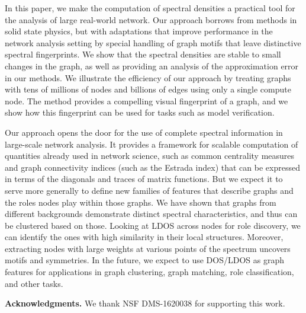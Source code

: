 In this paper, we make the computation of spectral densities a practical tool
for the analysis of large real-world network. Our approach borrows from methods
in solid state physics, but with adaptations that improve performance in the
network analysis setting by special handling of graph motifs that leave
distinctive spectral fingerprints. We show that the spectral densities are
stable to small changes in the graph, as well as providing an analysis of the
approximation error in our methods. We illustrate the efficiency of our
approach by treating graphs with tens of millions of nodes and billions of edges
using only a single compute node. The method provides a compelling visual
fingerprint of a graph, and we show how this fingerprint can be used for tasks
such as model verification.

Our approach opens the door for the use of complete spectral information in
large-scale network analysis. It provides a framework for scalable computation
of quantities already used in network science, such as common centrality
measures and graph connectivity indices (such as the Estrada index) that can be
expressed in terms of the diagonals and traces of matrix functions. But we
expect it to serve more generally to define new families of features that
describe graphs and the roles nodes play within those graphs. We have shown that
graphs from different backgrounds demonstrate distinct spectral
characteristics, and thus can be clustered based on those. Looking at LDOS
across nodes for role discovery, we can identify the ones with high similarity
in their local structures. Moreover, extracting nodes with large weights at
various points of the spectrum uncovers motifs and symmetries. In the future, we
expect to use DOS/LDOS as graph features for applications in graph clustering,
graph matching, role classification, and other tasks.

\noindent\textbf{Acknowledgments.} We thank NSF DMS-1620038 for supporting this
work.